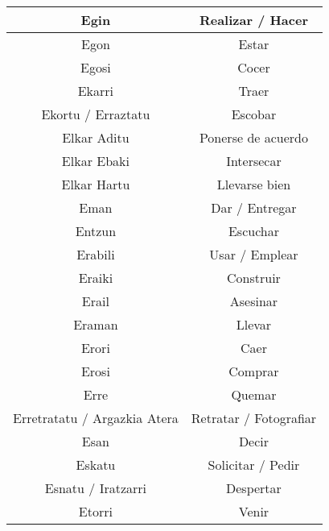 \documentclass[11pt, a4paper]{article}
\begin{document}
\begin{longtable}{cc}
    \hline
    Egin                          & Realizar / Hacer               \\
    \hline
    Egon                          & Estar                          \\
    \hline
    Egosi                         & Cocer                          \\
    \hline
    Ekarri                        & Traer                          \\
    \hline
    Ekortu / Erraztatu            & Escobar                        \\
    \hline
    Elkar Aditu                   & Ponerse de acuerdo             \\
    \hline
    Elkar Ebaki                   & Intersecar                     \\
    \hline
    Elkar Hartu                   & Llevarse bien                  \\
    \hline
    Eman                          & Dar / Entregar                 \\
    \hline
    Entzun                        & Escuchar                       \\
    \hline
    Erabili                       & Usar / Emplear                 \\
    \hline
    Eraiki                        & Construir                      \\
    \hline
    Erail                         & Asesinar                       \\
    \hline
    Eraman                        & Llevar                         \\
    \hline
    Erori                         & Caer                           \\
    \hline
    Erosi                         & Comprar                        \\
    \hline
    Erre                          & Quemar                         \\
    \hline
    Erretratatu / Argazkia Atera  & Retratar / Fotografiar         \\
    \hline
    Esan                          & Decir                          \\
    \hline
    Eskatu                        & Solicitar / Pedir              \\
    \hline
    Esnatu / Iratzarri            & Despertar                      \\
    \hline
    Etorri                        & Venir                          \\

\end{longtable}
\end{document}
